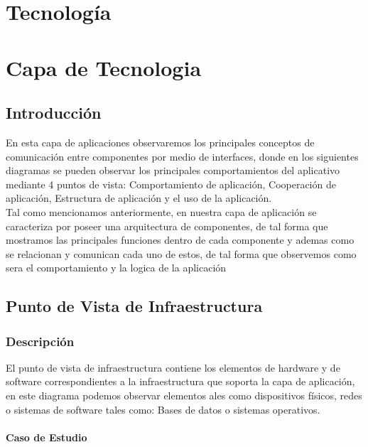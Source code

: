 \chapter{Tecnología}

\chapter{Capa de Tecnologia}

\section{Introducción}
En esta capa de aplicaciones observaremos los principales conceptos de comunicación entre componentes por medio de interfaces, donde en los siguientes diagramas se pueden observar los principales comportamientos del aplicativo mediante 4 puntos de vista: Comportamiento de aplicación, Cooperación de aplicación, Estructura de aplicación y el uso de la aplicación.\\
Tal como mencionamos anteriormente, en nuestra capa de aplicación se caracteriza por poseer una arquitectura de componentes, de tal forma que  mostramos las principales funciones dentro de cada componente y ademas como se relacionan y comunican cada uno de estos, de tal forma que observemos como sera el comportamiento y la logica de la aplicación

\section{Punto de Vista de Infraestructura}
\subsection{Descripción}
El punto de vista de infraestructura contiene los elementos de hardware y de software correspondientes a la infraestructura que soporta la capa de aplicación, en este diagrama podemos observar elementos ales como dispositivos físicos, redes o sistemas de software tales como: Bases de datos o sistemas operativos.

\subsubsection{Caso de Estudio}


